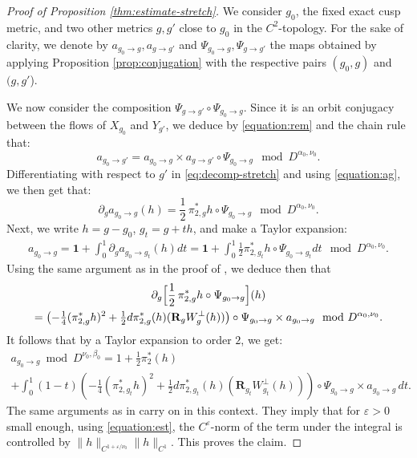 \documentclass[JEP,XML,SOM,Unicode,NoFloatCountersInSection]{cedram}
\newcommand{\eps}{\varepsilon}
\theoremstyle{plain}
\theoremstyle{definition}
\begin{document}
\begin{proof}[Proof of Proposition \ref{thm:estimate-stretch}]
We consider $g_0$, the fixed exact cusp metric, and two other metrics $g,g'$ close to $g_0$ in the $C^2$-topology. For the sake of clarity, we denote by $a_{g_0 \to g}, a_{g \to g'}$ and $\Psi_{g_0 \to g}, \Psi_{g \to g'}$ the maps obtained by applying Proposition \ref{prop:conjugation} with the respective pairs $(g_0,g)$ and $(g,g'$).

We now consider the composition $\Psi_{g\to g'}\circ\Psi_{g_0\to g}$. Since it is an orbit conjugacy between the flows of $X_{g_0}$ and $Y_{g'}$, we deduce by \eqref{equation:rem} and the chain rule that:
\begin{equation}\label{eq:decomp-stretch}
a_{g_0\to g'} = a_{g_0\to g} \times a_{g\to g'}\circ \Psi_{g_0\to g} \mod D^{\alpha_0,\nu_0}.
\end{equation}
Differentiating with respect to $g'$ in \eqref{eq:decomp-stretch} and using \eqref{equation:ag}, we then get that:
\[
\partial_{g} a_{g_0\to g}(h) = \frac{1}{2}\,\pi_{2,g}^\ast h \circ \Psi_{g_0\to g} \mod D^{\alpha_0,\nu_0}.
\]
Next, we write $h = g-g_0$, $g_t = g+th$, and make a Taylor expansion:
\begin{align*}
a_{g_0\to g} = \mathbf{1} + \int_0^1 \partial_g a_{g_0\to g_t}(h) dt= \mathbf{1} + \int_0^1 \tfrac{1}{2} \pi_{2,g_t}^\ast h \circ \Psi_{g_0\to g_t} dt \mod D^{\alpha_0,\nu_0}.
\end{align*}
Using the same argument as in the proof of \cite[Lem.\,5.7]{Bonthonneau-Lefeuvre-21}, we deduce then that
\begin{multline*}
\partial_g \Bigl[ \frac{1}{2}\,\pi_{2,g}^\ast h \circ \Psi_{g_0\to g} \Bigr](h)\\
= \left( -\tfrac{1}{4}(\pi_{2,g}^\ast h)^2 + \tfrac{1}{2} d \pi_{2,g}^\ast(h) ( \mathbf{R}_g W_g^\perp(h) )\right) \circ \Psi_{g_0\to g} \times a_{g_0\to g} \mod D^{\alpha_0,\nu_0}.
\end{multline*}
It follows that by a Taylor expansion to order $2$, we get:
\begin{multline*}
a_{g_0\to g}\bmod D^{\nu_0,\beta_0} = 1+ \tfrac{1}{2}\pi_{2}^\ast(h) \\
+ \int_0^1 (1-t) \left( -\tfrac{1}{4}(\pi_{2,g_t}^\ast h)^2 + \tfrac{1}{2} d \pi_{2,g_t}^\ast(h) ( \mathbf{R}_{g_t} W_{g_t}^\perp(h) )\right) \circ \Psi_{g_0\to g} \times a_{g_0\to g}\,dt.
\end{multline*}
The same arguments as in \cite[Lem.\,5.8]{Bonthonneau-Lefeuvre-21} carry on in this context. They imply that for $\eps > 0$ small enough, using \eqref{equation:est}, the $C^\eps$-norm of the term under the integral is controlled by $\|h \|_{C^{1+\eps/\nu_0}} \| h \|_{C^1}$. This proves the claim.
\end{proof}
\end{document}
